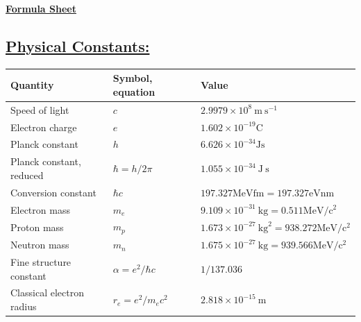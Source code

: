 \documentclass[a4paper,12pt]{article}
\begin{document}
\begin{center}\textbf{\underline{\huge{Formula Sheet}}}\end{center}

\subsection*{\underline{Physical Constants:}}
\begin{tabular}{lll}
    \hline Quantity                & Symbol, equation                         & Value                                                                          \\
    \hline Speed of light          & $c$                                      & $2.9979 \times 10^{8} \mathrm{~m} \mathrm{~s}^{-1}$                            \\
    Electron charge                & $e$                                      & $1.602 \times 10^{-19} \mathrm{C}$                                             \\
    Planck constant                & $h$                                      & $6.626 \times 10^{-34} \mathrm{Js}$                                            \\
    Planck constant, reduced       & $\hbar=h / 2 \pi$                        & $1.055 \times 10^{-34} \mathrm{~J} \mathrm{~s}$                                \\
    Conversion constant            & $\hbar c$                                & $197.327 \mathrm{MeVfm}=197.327 \mathrm{eVnm}$                                 \\
    \hline Electron mass           & $m_{e}$                                  & $9.109 \times 10^{-31} \mathrm{~kg}=0.511 \mathrm{MeV} / \mathrm{c}^{2}$       \\
    Proton mass                    & $m_{p}$                                  & $1.673 \times 10^{-27} \mathrm{~kg}^{2}=938.272 \mathrm{MeV} / \mathrm{c}^{2}$ \\
    Neutron mass                   & $m_{n}$                                  & $1.675 \times 10^{-27} \mathrm{~kg}=939.566 \mathrm{MeV} / \mathrm{c}^{2}$     \\
    \hline Fine structure constant & $\alpha=e^{2} / \hbar c$                 & $1 / 137.036$                                                                  \\
    Classical electron radius      & $r_{e}=e^{2} / m_{e} c^{2}$              & $2.818 \times 10^{-15} \mathrm{~m}$                                            \\

\end{tabular}
\end{document}
